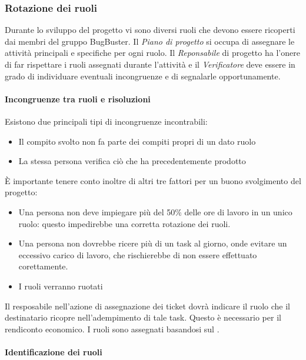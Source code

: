\subsubsection{Rotazione dei ruoli}

Durante lo sviluppo del progetto vi sono diversi ruoli che devono essere ricoperti dai membri del gruppo BugBuster. Il \textit{Piano di progetto} si occupa di assegnare le attività principali e specifiche per ogni ruolo. Il \textit{Reponsabile} di progetto ha l'onere di far rispettare i ruoli assegnati durante l'attività e il \textit{Verificatore} deve essere in grado di individuare eventuali incongruenze e di segnalarle opportunamente.
\paragraph*{Incongruenze tra ruoli e risoluzioni}
Esistono due principali tipi di incongruenze incontrabili:
\begin{itemize}

\item Il compito svolto non fa parte dei compiti propri di un dato ruolo
\item La stessa persona verifica ciò che ha precedentemente prodotto
\end{itemize}

È importante tenere conto inoltre di altri tre fattori per un buono svolgimento del progetto:
\begin{itemize}

\item Una persona non deve impiegare più del 50\% delle ore di lavoro in un unico ruolo: questo impedirebbe una corretta rotazione dei ruoli.
\item Una persona non dovrebbe ricere più di un task al giorno, onde evitare un eccessivo carico di lavoro, che rischierebbe di non essere effettuato corettamente.
\item I ruoli verranno ruotati %

\end{itemize}

Il resposabile nell'azione di assegnazione dei ticket dovr\`a indicare il ruolo che il destinatario ricopre nell'adempimento di tale task. Questo \`e necessario per il rendiconto economico. I ruoli sono assegnati basandosi sul \PianoDiProgetto.

\paragraph*{Identificazione dei ruoli}

